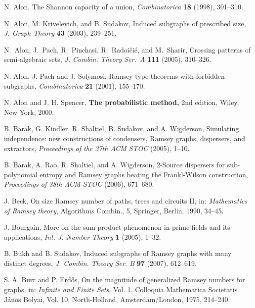 \documentclass[11pt]{article}
\begin{document}
\begin{thebibliography}{}

N. Alon, The Shannon capacity of a union, {\it Combinatorica} {\bf
18} (1998), 301--310.

N. Alon, M. Krivelevich, and B. Sudakov, Induced subgraphs of
prescribed size, {\it J. Graph Theory} {\bf 43} (2003), 239--251.

 N.~Alon, J.~Pach, R.~Pinchasi, R.~Radoi\v ci\'c,
  and M.~Sharir, Crossing patterns of semi-algebraic sets, {\em J.
    Combin. Theory Ser.~A} {\bf 111} (2005), 310--326.

N. Alon, J. Pach and J. Solymosi, Ramsey-type theorems with
forbidden subgraphs, {\it Combinatorica} {\bf 21} (2001), 155--170.

N. Alon and J. H. Spencer, {\bf The probabilistic method,} 2nd
edition, Wiley, New York, 2000.


B. Barak, G. Kindler, R. Shaltiel, B. Sudakov, and A. Wigderson,
Simulating independence: new constructions of condensers, Ramsey
graphs, dispersers, and extractors,  {\it Proceedings of the 37th
 ACM STOC} (2005), 1--10.

B. Barak, A. Rao, R. Shaltiel, and A. Wigderson, 2-Source dispersers
for sub-polynomial entropy and Ramsey graphs beating the
Frankl-Wilson construction, {\it Proceedings of 38th ACM  STOC }
(2006), 671--680.

J. Beck, On size Ramsey number of paths, trees and circuits II, in:
{\it Mathematics of Ramsey theory}, Algorithms Combin., 5, Springer,
Berlin, 1990, 34--45.

 J. Bourgain, More on the sum-product phenomenon in prime
fields and its applications, {\it Int. J. Number Theory} {\bf 1}
(2005), 1--32.

B. Bukh and B. Sudakov, Induced subgraphs of Ramsey graphs with many
distinct degrees, {\it J. Combin. Theory Ser. B} {\bf 97} (2007), 612--619.

S. A. Burr and P. Erd\H{o}s, On the magnitude of generalized Ramsey
numbers for graphs, in: {\it Infinite and Finite Sets}, Vol. 1,
Colloquia Mathematica Societatis J\'anos Bolyai, Vol. 10,
North-Holland, Amsterdam/London, 1975, 214--240.



\end{thebibliography}
\end{document}
